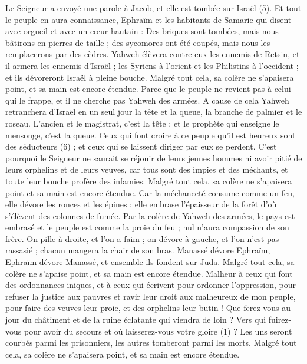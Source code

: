 \begin{multicols}{2}
Le Seigneur a envoyé une parole à Jacob, et elle est tombée sur Israël (5).
Et tout le peuple en aura connaissance, Ephraïm et les habitants de Samarie qui disent avec orgueil et avec un cœur hautain :
Des briques sont tombées, mais nous bâtirons en pierres de taille ; des sycomores ont été coupés, mais nous les remplacerons par des cèdres.
Yahweh élèvera contre eux les ennemis de Retsin, et il armera les ennemis d'Israël ;
les Syriens à l’orient et les Philistins à l’occident ; et ils dévoreront Israël à pleine bouche. Malgré tout cela, sa colère ne s’apaisera point, et sa main est encore étendue.
Parce que le peuple ne revient pas à celui qui le frappe, et il ne cherche pas Yahweh des armées.
A cause de cela Yahweh retranchera d'Israël en un seul jour la tête et la queue, la branche de palmier et le roseau.
L'ancien et le magistrat, c'est la tête ; et le prophète qui enseigne le mensonge, c'est la queue.
Ceux qui font croire à ce peuple qu'il est heureux sont des séducteurs (6) ; et ceux qui se laissent diriger par eux se perdent.
C'est pourquoi le Seigneur ne saurait se réjouir de leurs jeunes hommes ni avoir pitié de leurs orphelins et de leurs veuves, car tous sont des impies et des méchants, et toute leur bouche profère des infamies. Malgré tout cela, sa colère ne s’apaisera point et sa main est encore étendue.
Car la méchanceté consume comme un feu, elle dévore les ronces et les épines ; elle embrase l’épaisseur de la forêt d’où s’élèvent des colonnes de fumée.
Par la colère de Yahweh des armées, le pays est embrasé et le peuple est comme la proie du feu ; nul n’aura compassion de son frère.
On pille à droite, et l’on a faim ; on dévore à gauche, et l’on n’est pas rassasié ; chacun mangera la chair de son bras.
Manassé dévore Ephraïm, Ephraïm dévore Manassé, et ensemble ils fondent sur Juda. Malgré tout cela, sa colère ne s’apaise point, et sa main est encore étendue.
\VerseOne{}Malheur à ceux qui font des ordonnances iniques, et à ceux qui écrivent pour ordonner l'oppression,
pour refuser la justice aux pauvres et ravir leur droit aux malheureux de mon peuple, pour faire des veuves leur proie, et des orphelins leur butin !
Que ferez-vous au jour du châtiment et de la ruine éclatante qui viendra de loin ? Vers qui fuirez-vous pour avoir du secours et où laisserez-vous votre gloire (1) ?
Les uns seront courbés parmi les prisonniers, les autres tomberont parmi les morts. Malgré tout cela, sa colère ne s’apaisera point, et sa main est encore étendue.

\end{multicols}
